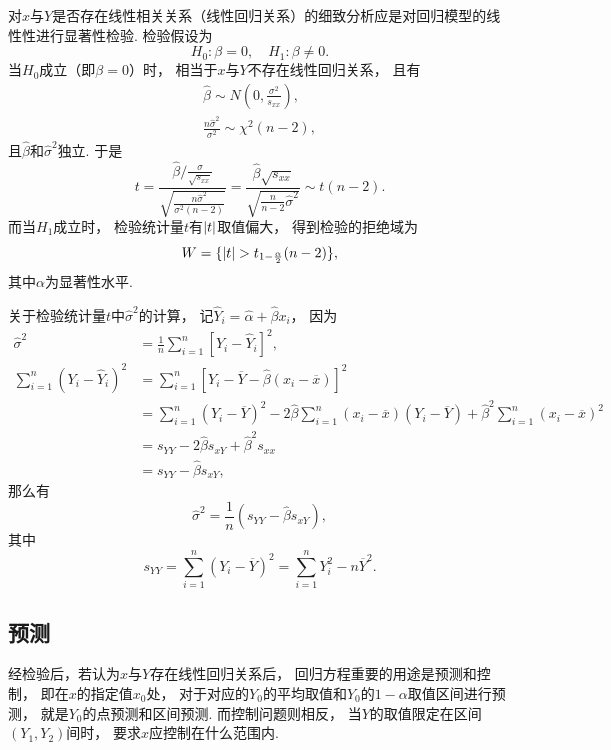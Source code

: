 对\(x\)与\(Y\)是否存在线性相关关系（线性回归关系）的细致分析应是对回归模型的线性性进行显著性检验.
检验假设为\begin{equation*}
	H_0: \beta = 0, \quad H_1: \beta \neq 0.
\end{equation*}
当\(H_0\)成立（即\(\beta = 0\)）时，
相当于\(x\)与\(Y\)不存在线性回归关系，
且有\begin{gather*}
	\hat{\beta} \sim N\left(0, \frac{\sigma^2}{s_{xx}}\right), \\
\frac{n \hat{\sigma}^2}{\sigma^2} \sim \chi^2(n-2),
\end{gather*}
且\(\hat{\beta}\)和\(\hat{\sigma}^2\)独立.
于是\begin{equation*}
	t = \frac{\hat{\beta} / \frac{\sigma}{\sqrt{s_{xx}}}}{\sqrt{\frac{n\hat{\sigma}^2}{\sigma^2(n-2)}}}
	= \frac{\hat{\beta} \sqrt{s_{xx}}}{\sqrt{\frac{n}{n-2} \hat{\sigma}^2}}
	\sim t(n-2).
\end{equation*}
而当\(H_1\)成立时，
检验统计量\(t\)有\(\abs{t}\)取值偏大，
得到检验的拒绝域为\begin{equation*}
	W = \{ \abs{t} > t_{1-\frac{\alpha}{2}}(n-2) \},
\end{equation*}其中\(\alpha\)为显著性水平.

关于检验统计量\(t\)中\(\hat{\sigma}^2\)的计算，
记\(\hat{Y}_i = \hat{\alpha}+\hat{\beta} x_i\)，
因为\begin{align*}
	\hat{\sigma}^2 &= \frac{1}{n} \sum_{i=1}^n[Y_i-\hat{Y}_i]^2, \\
	\sum_{i=1}^n(Y_i-\hat{Y}_i)^2
	&= \sum_{i=1}^n[Y_i-\overline{Y}-\hat{\beta}(x_i-\overline{x})]^2 \\
	&= \sum_{i=1}^n(Y_i-\overline{Y})^2
		-2\hat{\beta} \sum_{i=1}^n(x_i-\overline{x})(Y_i-\overline{Y})
		+\hat{\beta}^2 \sum_{i=1}^n(x_i-\overline{x})^2 \\
	&= s_{YY} - 2 \hat{\beta} s_{xY} + \hat{\beta}^2 s_{xx} \\
	&= s_{YY} - \hat{\beta} s_{xY},
\end{align*}
那么有\begin{equation*}
	\hat{\sigma}^2 = \frac{1}{n} (s_{YY} - \hat{\beta} s_{xY}),
\end{equation*}
其中\begin{equation*}
	s_{YY} = \sum_{i=1}^n(Y_i - \overline{Y})^2
	= \sum_{i=1}^n{Y_i^2 - n\overline{Y}^2}.
\end{equation*}

\subsection{预测}
经检验后，若认为\(x\)与\(Y\)存在线性回归关系后，
回归方程重要的用途是预测和控制，
即在\(x\)的指定值\(x_0\)处，
对于对应的\(Y_0\)的平均取值和\(Y_0\)的\(1-\alpha\)取值区间进行预测，
就是\(Y_0\)的点预测和区间预测.
而控制问题则相反，
当\(Y\)的取值限定在区间\((Y_1,Y_2)\)间时，
要求\(x\)应控制在什么范围内.
